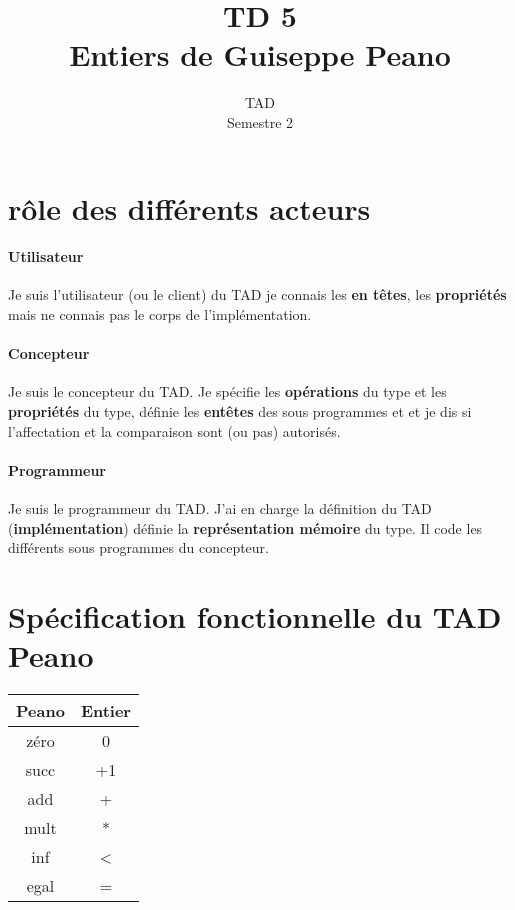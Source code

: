 \documentclass{article}
\title{TD 5\\ Entiers de Guiseppe Peano}
\date{TAD\\ Semestre 2}
\begin{document}
	\maketitle
	\section{rôle des différents acteurs}
		\paragraph{Utilisateur}
			Je suis l'utilisateur (ou le client) du TAD je connais les 
			\textbf{en têtes}, les \textbf{propriétés} mais ne connais pas 
			le corps de l'implémentation.
		\paragraph{Concepteur}
			Je suis le concepteur du TAD. Je spécifie les \textbf{opérations}
			du type et les \textbf{propriétés} du type, définie les 
			\textbf{entêtes} des sous programmes et et je dis si l'affectation 
			et la comparaison sont (ou pas) autorisés.
		\paragraph{Programmeur}
			Je suis le programmeur du TAD. J'ai en charge la définition du TAD
			(\textbf{implémentation}) définie la \textbf{représentation mémoire}
			du type. Il code les différents sous programmes du concepteur.

	\section{Spécification fonctionnelle du TAD Peano}
		\begin{tabular}{|c|c|}
			\hline
			\textbf{Peano} & \textbf{Entier} \\
			\hline
			zéro & 0 \\
			\hline
			succ & +1\\
			\hline
			add & +\\
			\hline
			mult & *\\
			\hline
			inf & <\\
			\hline
			egal & =\\
			\hline
		\end{tabular}
\end{document}
